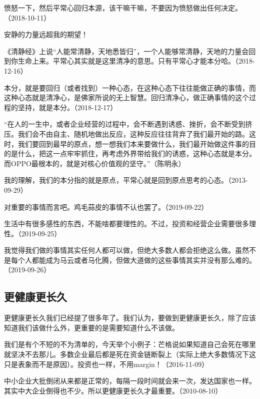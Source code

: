 愤怒一下，然后平常心回归本源，该干嘛干嘛，不要因为愤怒做出任何决定。（2018-10-11）


安静的力量远超我的期望！

《清静经》上说“人能常清静，天地悉皆归”，一个人能够常清静，天地的力量会回到你生命上来。平常心其实就是这里清净的意思。只有平常心才能本分哈。（2018-12-16）

本分，就是要回归（或者找到）一种心态，在这种心态下往往能做正确的事情，而这种心态就是清净心，是佛家所说的无上智慧。回归清净心，做正确事情的这个过程的坚持，就是本分。（2018-12-17）

“在人的一生中，或者企业经营的过程中，会不断遇到诱惑、挫折，会不断受到挤压。我们会不由自主、随机地做出反应，这种反应往往背弃了我们最开始的路。这时，我们要回到最早的原点，想一想我们本来要做什么，我们最开始做这件事的目的是什么，把这一点牢牢抓住，再考虑外界带给我们的诱惑，这种心态就是本分。而OPPO最根本的，就是对核心价值观的坚守。”（陈明永）

我的理解，我们的本分指的就是原点，平常心就是回到原点思考的心态。（2013-09-29）


对重要的事情而言吧。鸡毛蒜皮的事情不认也罢了。（2019-09-22）

生活中有很多感性的东西，不能啥都要理性的。不过，投资和经营企业需要很多理性。（2019-09-25）

我觉得我们做的事情其实任何人都可以做，但绝大多数人都会拒绝这么做。虽然不是每个人都能成为马云或者马化腾，但做大道做的这些事情其实并没有那么难的。（2019-09-26）

\subsection{更健康更长久}

更健康更长久我们已经提了很多年了。我们认为，要做到更健康更长久，除了应该知道我们该做什么外，更重要的是需要知道什么不该做。

我们是有个不短的不为清单的，今天举个小例子：芒格说如果知道自己会死在哪里就坚决不去那儿。多数企业最后都是死在资金链断裂上（实际上绝大多数情况下这只是表象而不是原因）。投资也一样，不用margin！（2016-11-09）


中小企业大批倒闭从来都是正常的，每隔一段时间就会来一次，发达国家也一样。其实中大企业倒得也不少。所以更健康更长久才最重要。（2010-08-10）

